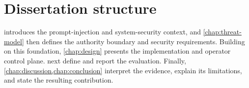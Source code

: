 \section{Dissertation structure}

 introduces the prompt-injection and system-security
context, and \cref{chap:threat-model} then defines the authority boundary and
security requirements. Building on this foundation, \cref{chap:design}
presents the implementation and operator control plane.
 next define and report the evaluation.
Finally, \cref{chap:discussion,chap:conclusion} interpret the evidence, explain
its limitations, and state the resulting contribution.
